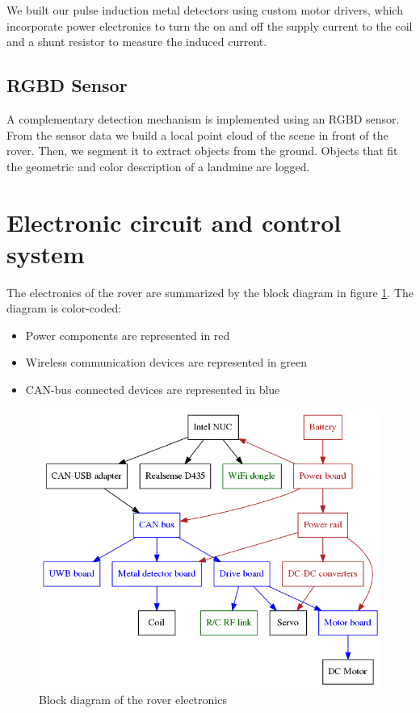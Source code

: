 We built our pulse induction metal detectors using custom motor drivers, which incorporate power electronics to turn the on and off the supply current to the coil and a shunt resistor to measure the induced current.

\subsection{RGBD Sensor}
A complementary detection mechanism is implemented using an RGBD sensor.
From the sensor data we build a local point cloud of the scene in front of the rover.
Then, we segment it to extract objects from the ground.
Objects that fit the geometric and color description of a landmine are logged.


\section{Electronic circuit and control system}
The electronics of the rover are summarized by the block diagram in figure \ref{fig:block-diagram}.
The diagram is color-coded:
\begin{itemize}
    \item Power components are represented in red
    \item Wireless communication devices are represented in green
    \item CAN-bus connected devices are represented in blue
\end{itemize}

\begin{figure}[htbp]
   \caption{\label{fig:block-diagram} Block diagram of the rover electronics}
   \includegraphics[width=\textwidth]{images/diagram}
\end{figure}

